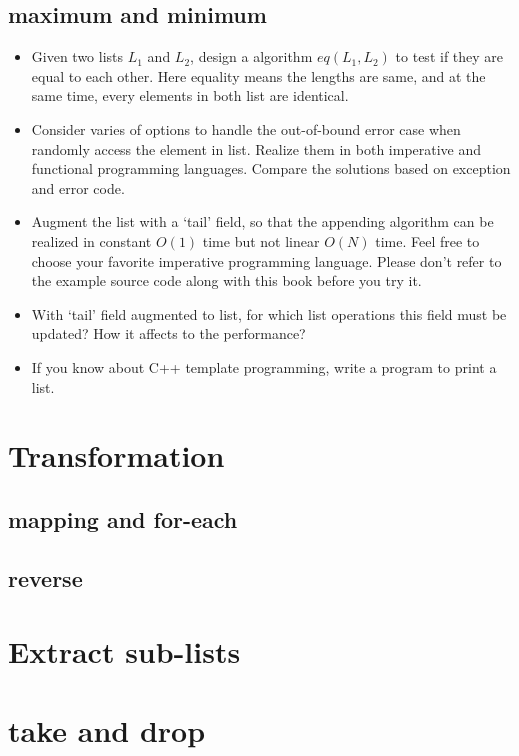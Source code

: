 \documentclass{article}
\begin{document}
\subsection{maximum and minimum}

\begin{Exercise}
\begin{itemize}
\item Given two lists $L_1$ and $L_2$, design a algorithm $eq(L_1, L_2)$ to test if they are equal to each other.
Here equality means the lengths are same, and at the same time, every elements in both list are identical.
\item Consider varies of options to handle the out-of-bound error case when randomly access the element in list. Realize
them in both imperative and functional programming languages. Compare the solutions based on exception and error code.
\item Augment the list with a `tail' field, so that the appending algorithm can be realized in constant $O(1)$ time but
not linear $O(N)$ time. Feel free to choose your favorite imperative programming language. Please don't refer to the
example source code along with this book before you try it.
\item With `tail' field augmented to list, for which list operations this field must be updated? How it affects to the
performance?
\item If you know about C++ template programming, write a program to print a list.
\end{itemize}
\end{Exercise}

\section{Transformation}

\subsection{mapping and for-each}

\subsection{reverse}

\section{Extract sub-lists}

\section{take and drop}
\end{document}

